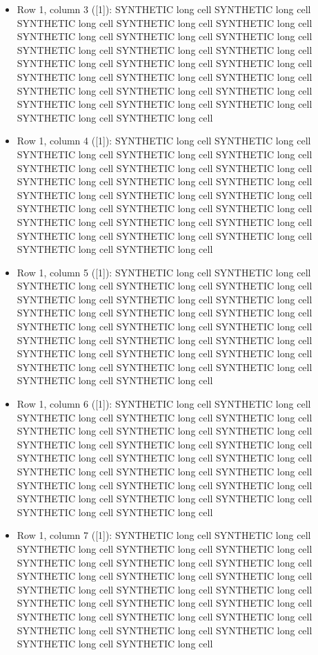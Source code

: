 \documentclass[journal]{IEEEtran}
\begin{document}
\begin{itemize}
\item[5.] Row 1, column 3 ([1]): SYNTHETIC long cell SYNTHETIC long cell SYNTHETIC long cell SYNTHETIC long cell SYNTHETIC long cell SYNTHETIC long cell SYNTHETIC long cell SYNTHETIC long cell SYNTHETIC long cell SYNTHETIC long cell SYNTHETIC long cell SYNTHETIC long cell SYNTHETIC long cell SYNTHETIC long cell SYNTHETIC long cell SYNTHETIC long cell SYNTHETIC long cell SYNTHETIC long cell SYNTHETIC long cell SYNTHETIC long cell SYNTHETIC long cell SYNTHETIC long cell SYNTHETIC long cell SYNTHETIC long cell SYNTHETIC long cell
\item[6.] Row 1, column 4 ([1]): SYNTHETIC long cell SYNTHETIC long cell SYNTHETIC long cell SYNTHETIC long cell SYNTHETIC long cell SYNTHETIC long cell SYNTHETIC long cell SYNTHETIC long cell SYNTHETIC long cell SYNTHETIC long cell SYNTHETIC long cell SYNTHETIC long cell SYNTHETIC long cell SYNTHETIC long cell SYNTHETIC long cell SYNTHETIC long cell SYNTHETIC long cell SYNTHETIC long cell SYNTHETIC long cell SYNTHETIC long cell SYNTHETIC long cell SYNTHETIC long cell SYNTHETIC long cell SYNTHETIC long cell SYNTHETIC long cell
\item[7.] Row 1, column 5 ([1]): SYNTHETIC long cell SYNTHETIC long cell SYNTHETIC long cell SYNTHETIC long cell SYNTHETIC long cell SYNTHETIC long cell SYNTHETIC long cell SYNTHETIC long cell SYNTHETIC long cell SYNTHETIC long cell SYNTHETIC long cell SYNTHETIC long cell SYNTHETIC long cell SYNTHETIC long cell SYNTHETIC long cell SYNTHETIC long cell SYNTHETIC long cell SYNTHETIC long cell SYNTHETIC long cell SYNTHETIC long cell SYNTHETIC long cell SYNTHETIC long cell SYNTHETIC long cell SYNTHETIC long cell SYNTHETIC long cell
\item[8.] Row 1, column 6 ([1]): SYNTHETIC long cell SYNTHETIC long cell SYNTHETIC long cell SYNTHETIC long cell SYNTHETIC long cell SYNTHETIC long cell SYNTHETIC long cell SYNTHETIC long cell SYNTHETIC long cell SYNTHETIC long cell SYNTHETIC long cell SYNTHETIC long cell SYNTHETIC long cell SYNTHETIC long cell SYNTHETIC long cell SYNTHETIC long cell SYNTHETIC long cell SYNTHETIC long cell SYNTHETIC long cell SYNTHETIC long cell SYNTHETIC long cell SYNTHETIC long cell SYNTHETIC long cell SYNTHETIC long cell SYNTHETIC long cell
\item[9.] Row 1, column 7 ([1]): SYNTHETIC long cell SYNTHETIC long cell SYNTHETIC long cell SYNTHETIC long cell SYNTHETIC long cell SYNTHETIC long cell SYNTHETIC long cell SYNTHETIC long cell SYNTHETIC long cell SYNTHETIC long cell SYNTHETIC long cell SYNTHETIC long cell SYNTHETIC long cell SYNTHETIC long cell SYNTHETIC long cell SYNTHETIC long cell SYNTHETIC long cell SYNTHETIC long cell SYNTHETIC long cell SYNTHETIC long cell SYNTHETIC long cell SYNTHETIC long cell SYNTHETIC long cell SYNTHETIC long cell SYNTHETIC long cell

\end{itemize}
\end{document}
